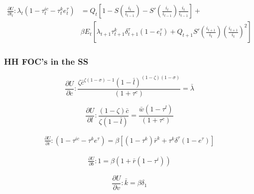 \begin{equation}
\begin{split}
\frac{\partial U}{\partial i_{t}}: \lambda_{t}(1-\tau_{t}^{ic}-\tau_{t}^{k}e_{t}^{\tau}) & = Q_{t}\left[1-S\left(\frac{i_{t}}{i_{t-1}}\right)-S'\left(\frac{i_{t}}{i_{t-1}}\right)\frac{i_{t}}{i_{t-1}} \right] + \\
&  \beta E_{t}\left[\lambda_{t+1}\tau_{t+1}^{k}\delta_{t+1}^{\tau}(1-e_{t}^{\tau}) + Q_{t+1}S'\left(\frac{i_{t+1}}{i_{t}}\right)\left(\frac{i_{t+1}}{i_{t}}\right)^{2}\right]
\end{split}
\end{equation}



\subsubsection{HH FOC's in the SS}

\begin{equation}
\frac{\partial U}{\partial c}:\frac{\zeta \bar{c}^{\zeta(1-\sigma)-1}(1-\bar{l})^{(1-\zeta)(1-\sigma)}}{(1+\tau^{c})} = \bar{\lambda}
\end{equation}

\begin{equation}
\frac{\partial U}{\partial l}: \frac{(1-\zeta)\bar{c}}{\zeta (1-\bar{l})} = \frac{\bar{w}(1-\tau^{l})}{(1+\tau^{c})}
\end{equation}


 \begin{equation}
\begin{split}
\frac{\partial U}{\partial i}:\left(1-\tau^{ic}-\tau^{k}e^{\tau}\right) = \beta \left[(1-\tau^{k})\bar{r}^{k}+ \tau^{k}\delta^{\tau}(1-e^{\tau})\right]
 \end{split}
  \end{equation}


\begin{equation}
\begin{split}
\frac{\partial U}{\partial b}: 1 = \beta(1+\bar{r}(1-\tau^{i}))
\end{split}
\end{equation}

\begin{equation}
\frac{\partial U}{\partial v}: \bar{k} = \beta \delta_{1}
\end{equation}


